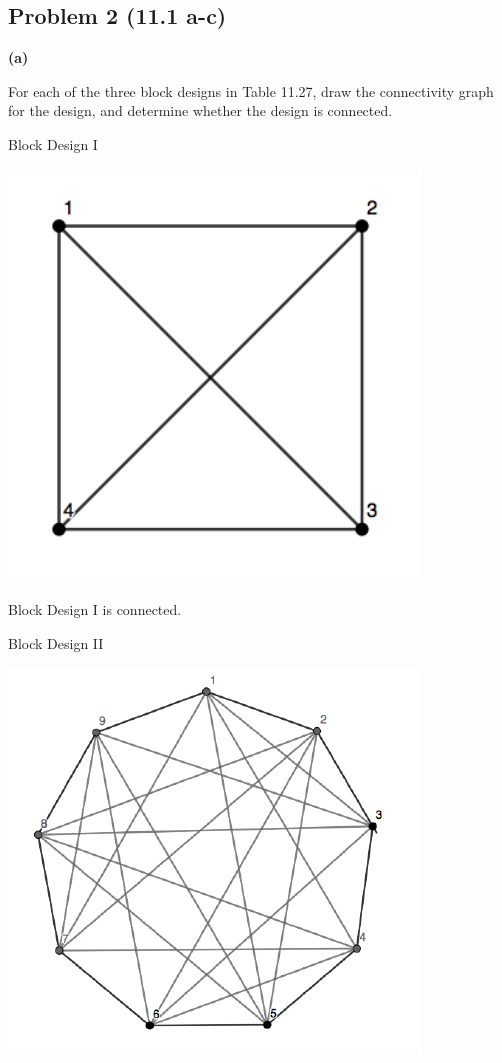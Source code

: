 \documentclass[12pt,]{article}
\begin{document}
\subsection{Problem 2 (11.1 a-c)}\label{problem-2-11.1-a-c}

\textbf{(a)}

For each of the three block designs in Table 11.27, draw the
connectivity graph for the design, and determine whether the design is
connected.

\begin{center}
Block Design I
\end{center}

\begin{center}\includegraphics{Markdown_HW_8_files/figure-latex/unnamed-chunk-7-1} \end{center}

Block Design I is connected.

\begin{center}
Block Design II
\end{center}

\begin{center}\includegraphics{Markdown_HW_8_files/figure-latex/unnamed-chunk-8-1} \end{center}
\end{document}
